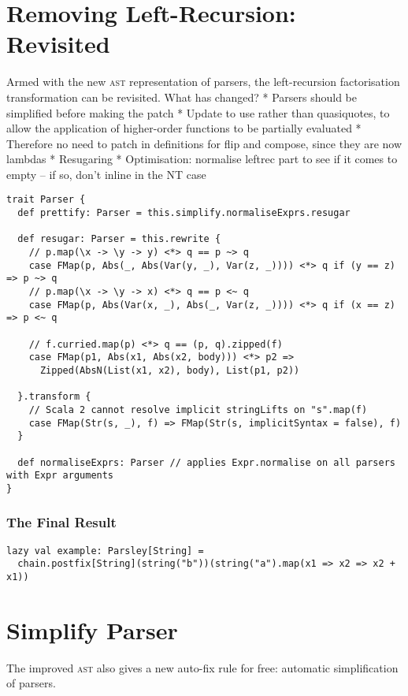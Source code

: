 \documentclass[../../main.tex]{subfiles}
\begin{document}

\section{Removing Left-Recursion: Revisited}
Armed with the new \textsc{ast} representation of parsers, the left-recursion factorisation transformation can be revisited.
What has changed?
* Parsers should be simplified before making the patch
* Update to use  rather than quasiquotes, to allow the application of higher-order functions to be partially evaluated
* Therefore no need to patch in definitions for flip and compose, since they are now lambdas
* Resugaring
* Optimisation: normalise leftrec part to see if it comes to empty -- if so, don't inline in the NT case

\begin{verbatim}
trait Parser {
  def prettify: Parser = this.simplify.normaliseExprs.resugar

  def resugar: Parser = this.rewrite {
    // p.map(\x -> \y -> y) <*> q == p ~> q
    case FMap(p, Abs(_, Abs(Var(y, _), Var(z, _)))) <*> q if (y == z) => p ~> q
    // p.map(\x -> \y -> x) <*> q == p <~ q
    case FMap(p, Abs(Var(x, _), Abs(_, Var(z, _)))) <*> q if (x == z) => p <~ q

    // f.curried.map(p) <*> q == (p, q).zipped(f)
    case FMap(p1, Abs(x1, Abs(x2, body))) <*> p2 =>
      Zipped(AbsN(List(x1, x2), body), List(p1, p2))

  }.transform {
    // Scala 2 cannot resolve implicit stringLifts on "s".map(f)
    case FMap(Str(s, _), f) => FMap(Str(s, implicitSyntax = false), f)
  }

  def normaliseExprs: Parser // applies Expr.normalise on all parsers with Expr arguments
}
\end{verbatim}


\subsubsection{The Final Result}
\begin{verbatim}
lazy val example: Parsley[String] =
  chain.postfix[String](string("b"))(string("a").map(x1 => x2 => x2 + x1))
\end{verbatim}

\section{Simplify Parser}
The improved  \textsc{ast} also gives a new auto-fix rule for free: automatic simplification of parsers.
\end{document}
